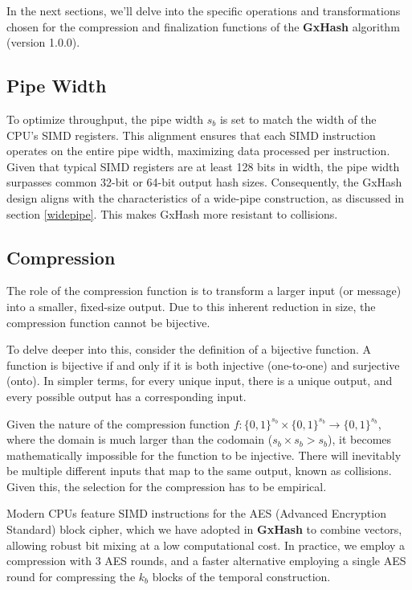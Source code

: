 \documentclass[10pt]{article}
\begin{document}
In the next sections, we'll delve into the specific operations and transformations chosen for the compression and finalization functions of the \textbf{GxHash} algorithm (version 1.0.0).

\subsection{Pipe Width}

To optimize throughput, the pipe width \( s_b \) is set to match the width of the CPU's SIMD registers. This alignment ensures that each SIMD instruction operates on the entire pipe width, maximizing data processed per instruction. Given that typical SIMD registers are at least 128 bits in width, the pipe width surpasses common 32-bit or 64-bit output hash sizes. Consequently, the GxHash design aligns with the characteristics of a wide-pipe construction, as discussed in section \ref{widepipe}.
This makes GxHash more resistant to collisions.

\subsection{Compression}

The role of the compression function is to transform a larger input (or message) into a smaller, fixed-size output. Due to this inherent reduction in size, the compression function cannot be bijective.

To delve deeper into this, consider the definition of a bijective function. A function is bijective if and only if it is both injective (one-to-one) and surjective (onto). In simpler terms, for every unique input, there is a unique output, and every possible output has a corresponding input.

Given the nature of the compression function \( f: \{0,1\}^{s_b} \times \{0,1\}^{s_b} \to \{0,1\}^{s_b} \), where the domain is much larger than the codomain (\( s_b \times s_b > s_b \)), it becomes mathematically impossible for the function to be injective. There will inevitably be multiple different inputs that map to the same output, known as collisions. Given this, the selection for the compression has to be empirical.

Modern CPUs feature SIMD instructions for the AES (Advanced Encryption Standard) block cipher, which we have adopted in \textbf{GxHash} to combine vectors, allowing robust bit mixing at a low computational cost. In practice, we employ a compression with 3 AES rounds, and a faster alternative employing a single AES round for compressing the \( k_b \) blocks of the temporal construction.
\end{document}
